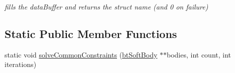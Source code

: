 \begin{CompactItemize}
\begin{CompactList}\small\item\em fills the dataBuffer and returns the struct name (and 0 on failure) \item\end{CompactList}\end{CompactItemize}
\subsection*{Static Public Member Functions}
\begin{CompactItemize}
\item 
static void \hyperlink{classbt_soft_body_e8a2fc459b2afc985fbb03c1b0203bec}{solveCommonConstraints} (\hyperlink{classbt_soft_body}{btSoftBody} $\ast$$\ast$bodies, int count, int iterations)
\end{CompactItemize}
